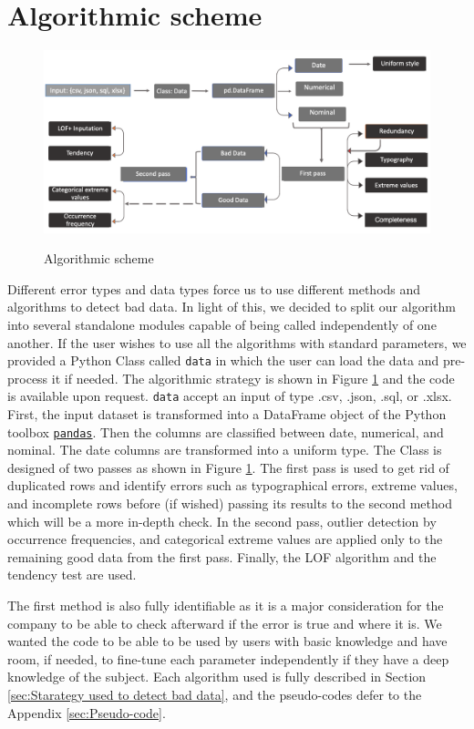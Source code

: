 \documentclass{article}
\begin{document}
\section{Algorithmic scheme} %
\label{sec:Algorithmic scheme}
\begin{figure}[H]
    \centering
    \includegraphics[scale=0.17]{picture/algo_scheme.png}
    \label{fig:algo_scheme}
    \caption{Algorithmic scheme}
\end{figure}
Different error types and data types force us to use different methods and algorithms to detect bad data.
In light of this, we decided to split our algorithm into several standalone modules capable of being called independently of one another.
If the user wishes to use all the algorithms with standard parameters, we provided a Python Class called \texttt{data} in which the user can load the data and pre-process it if needed.
The algorithmic strategy is shown in Figure \ref{fig:algo_scheme} and the code is available upon request.
\texttt{data} accept an input of type .csv, .json, .sql, or .xlsx.
First, the input dataset is transformed into a DataFrame object of the Python toolbox \href{https://pandas.pydata.org/}{\texttt{pandas}}.
Then the columns are classified between date, numerical, and nominal.
The date columns are transformed into a uniform type.
The Class is designed of two passes as shown in Figure \ref{fig:algo_scheme}.
The first pass is used to get rid of duplicated rows and identify errors such as typographical errors, extreme values, and incomplete rows before (if wished) passing its results to the second method which will be a more in-depth check.
In the second pass, outlier detection by occurrence frequencies, and categorical extreme values are applied only to the remaining good data from the first pass.
Finally, the LOF algorithm and the tendency test are used.

The first method is also fully identifiable as it is a major consideration for the company to be able to check afterward if the error is true and where it is.
We wanted the code to be able to be used by users with basic knowledge and have room, if needed, to fine-tune each parameter independently if they have a deep knowledge of the subject.
Each algorithm used is fully described in Section \ref{sec:Starategy used to detect bad data}, and the pseudo-codes defer to the Appendix \ref{sec:Pseudo-code}.
\end{document}
